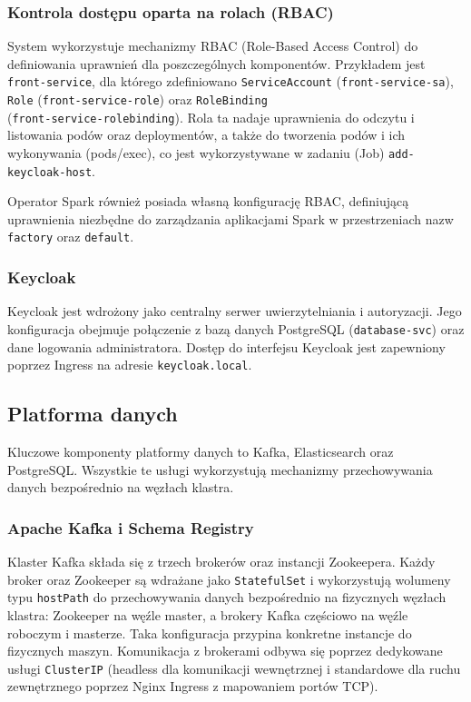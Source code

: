 \subsubsection{Kontrola dostępu oparta na rolach (RBAC)}
System wykorzystuje mechanizmy RBAC (Role-Based Access Control) do definiowania uprawnień dla poszczególnych komponentów. Przykładem jest \texttt{front-service}, dla którego zdefiniowano \texttt{ServiceAccount} (\texttt{front-service-sa}), \texttt{Role} (\texttt{front-service-role}) oraz \texttt{RoleBinding} \\ (\texttt{front-service-rolebinding}). Rola ta nadaje uprawnienia do odczytu i listowania podów oraz deploymentów, a także do tworzenia podów i ich wykonywania (pods/exec), co jest wykorzystywane w zadaniu (Job) \texttt{add-keycloak-host}.

Operator Spark również posiada własną konfigurację RBAC, definiującą uprawnienia niezbędne do zarządzania aplikacjami Spark w przestrzeniach nazw \texttt{factory} oraz \texttt{default}.

\subsubsection{Keycloak}
Keycloak jest wdrożony jako centralny serwer uwierzytelniania i autoryzacji. Jego konfiguracja obejmuje połączenie z bazą danych PostgreSQL (\texttt{database-svc}) oraz dane logowania administratora. Dostęp do interfejsu Keycloak jest zapewniony poprzez Ingress na adresie \texttt{keycloak.local}.

\subsection{Platforma danych}

Kluczowe komponenty platformy danych to Kafka, Elasticsearch oraz PostgreSQL. Wszystkie te usługi wykorzystują mechanizmy przechowywania danych bezpośrednio na węzłach klastra.

\subsubsection{Apache Kafka i Schema Registry}
Klaster Kafka składa się z trzech brokerów oraz instancji Zookeepera. Każdy broker oraz Zookeeper są wdrażane jako \texttt{StatefulSet} i wykorzystują wolumeny typu \texttt{hostPath} do przechowywania danych bezpośrednio na fizycznych węzłach klastra: Zookeeper na węźle master, a brokery Kafka częściowo na węźle roboczym i masterze. Taka konfiguracja przypina konkretne instancje do fizycznych maszyn. Komunikacja z brokerami odbywa się poprzez dedykowane usługi \texttt{ClusterIP} (headless dla komunikacji wewnętrznej i standardowe dla ruchu zewnętrznego poprzez Nginx Ingress z mapowaniem portów TCP).

